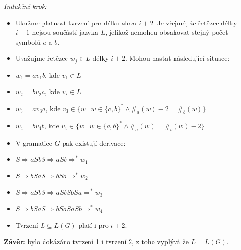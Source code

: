 \documentclass[11pt, a4paper, titlepage]{article}
\begin{document}
\medskip
\textit{Indukční krok:}

\begin{itemize}
    \item Ukažme platnost tvrzení pro délku slova $i+2$. Je zřejmé, že řetězce délky $i+1$ nejsou součástí jazyka $L$, jelikož nemohou obsahovat stejný počet symbolů $a$ a $b$.

    \item Uvažujme řetězec $w_j \in L$ délky $i+2$. Mohou nastat následující situace:
\end{itemize}

\begin{itemize}[leftmargin=2cm, label=$\circ$]
    \item $w_1 = a v_1 b$, kde $v_1 \in L$
    \item $w_2 = b v_2 a$, kde $v_2 \in L$
    \item $w_3 = a v_3 a$, kde $v_3 \in \{ w \mid w \in \{ a, b \}^* \land \#_a(w) - 2 = \#_b(w) \}$
    \item $w_4 = b v_4 b$, kde $v_4 \in \{ w \mid w \in \{ a, b \}^* \land \#_a(w) = \#_b(w) - 2 \}$
\end{itemize}

\begin{itemize}
    \item V gramatice $G$ pak existují derivace:
\end{itemize}

\begin{itemize}[leftmargin=2cm, label=$\circ$]
    \item $S \Rightarrow aSbS \Rightarrow aSb \Rightarrow^* w_1$
    \item $S \Rightarrow bSaS \Rightarrow bSa \Rightarrow^* w_2$
    \item $S \Rightarrow aSbS \Rightarrow aSbSbSa \Rightarrow^* w_3$
    \item $S \Rightarrow bSaS \Rightarrow bSaSaSb \Rightarrow^* w_4$
\end{itemize}

\begin{itemize}
    \item Tvrzení $L \subseteq L(G)$ platí i pro $i + 2$.
\end{itemize}
\bigskip



\textbf{Závěr:} bylo dokázáno tvrzení 1 i tvrzení 2, z toho vyplývá že $L = L(G)$.


\end{document}
